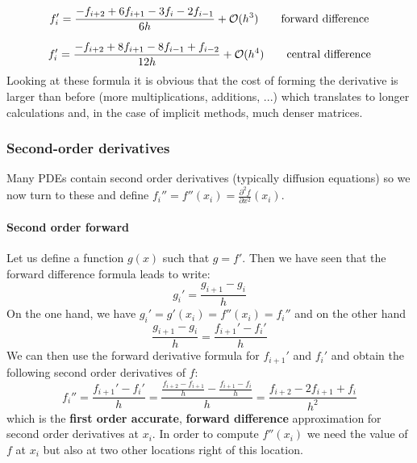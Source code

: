 \begin{equation}
f_i' = \frac{-  f_{i+2} +6 f_{i+1} - 3 f_{i} -2 f_{i-1}}{6 h} + {\cal O}(h^3)
\qquad
\text{forward difference}
\end{equation}

\begin{equation}
f_i' = \frac{-  f_{i+2} +8 f_{i+1} - 8 f_{i-1} + f_{i-2}}{12 h} + {\cal O}(h^4)
\qquad
\text{central difference}
\end{equation}
Looking at these formula it is obvious that the cost of forming the derivative 
is larger than before (more multiplications, additions, ...) which translates
to longer calculations and, in the case of implicit methods, much denser matrices. 


\subsubsection{Second-order derivatives}

Many PDEs contain second order derivatives (typically diffusion equations)
so we now turn to these and 
define $f_i''=f''(x_i) = \frac{\partial^2 f}{\partial x^2} (x_i)$. 

\paragraph{Second order forward} 
Let us define a function $g(x)$ such that $g=f'$. Then we have seen that the forward 
difference formula leads to write: 
\begin{equation}
g_i' = \frac{g_{i+1}-g_{i}}{h}
\end{equation}
On the one hand, we have $g_i'=g'(x_i)=f''(x_i)=f_i''$ and on the other hand
\begin{equation}
\frac{g_{i+1}-g_{i}}{h} = \frac{f_{i+1}'-f_{i}'}{h}
\end{equation}
We can then use the forward derivative formula for $f_{i+1}'$ and $f_{i}'$ and 
obtain the following second order derivatives of $f$:
\begin{equation}
f_{i}'' 
= \frac{f_{i+1}'-f_i'}{h} 
= \frac{\frac{f_{i+2}-f_{i+1}}{h}-
\frac{f_{i+1}-f_i}{h}
}{h} 
= \frac{f_{i+2}-2f_{i+1}+f_i}{h^2} 
\end{equation}
which is the {\bf first order accurate}, {\bf forward difference} approximation for
second order derivatives at $x_{i}$.
In order to compute $f''(x_i)$ we need the value of $f$ at $x_i$ but also at two 
other locations right of this location.

